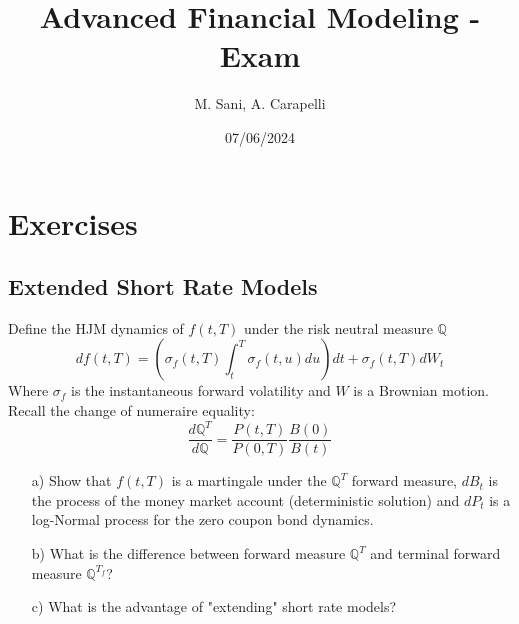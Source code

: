 \documentclass{article}
\title{Advanced Financial Modeling - Exam}
\author{M. Sani, A. Carapelli}
\date{07/06/2024}
\begin{document}
\maketitle

\section{Exercises}
\subsection{Extended Short Rate Models}
Define the HJM dynamics of $f(t,T)$ under the risk neutral measure $\mathbb{Q}$
\begin{equation*}
    df(t,T) = \left( \sigma_f(t,T) \int_t^T  \sigma_f(t,u) du \right) dt + \sigma_f(t,T)dW_t
\end{equation*}
Where $\sigma_f$ is the instantaneous forward volatility and $W$ is a Brownian motion. Recall the change of numeraire equality:
\begin{equation*}
    \frac{d \mathbb{Q}^T}{d \mathbb{Q}} = \frac{P(t,T)}{P(0,T)} \frac{B(0)}{B(t)}
\end{equation*}
\begin{itemize}
    \item[a)] Show that  $f(t,T)$ is a martingale under the $ \mathbb{Q}^T$ forward measure, $dB_t$ is the process of the money market account (deterministic solution) and $dP_t$ is a log-Normal process for the zero coupon bond dynamics.
    \item[b)]  What is the difference between forward measure $ \mathbb{Q}^T$ and terminal forward measure $ \mathbb{Q}^{T_f}$?
    \item[c)] What is the advantage of "extending" short rate models? 
\end{itemize}
\end{document}

